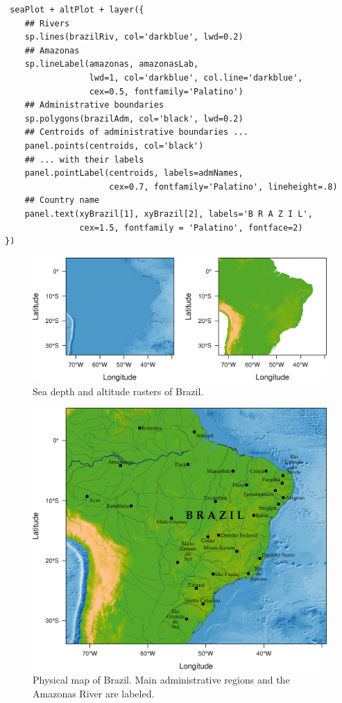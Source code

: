 \documentclass[smallroyalvopaper]{memoir}
\begin{document}
\begin{enumerate}

\lstset{language=R,numbers=none}
\begin{lstlisting}
 seaPlot + altPlot + layer({
    ## Rivers
    sp.lines(brazilRiv, col='darkblue', lwd=0.2)
    ## Amazonas
    sp.lineLabel(amazonas, amazonasLab, 
                 lwd=1, col='darkblue', col.line='darkblue',
                 cex=0.5, fontfamily='Palatino')
    ## Administrative boundaries
    sp.polygons(brazilAdm, col='black', lwd=0.2)
    ## Centroids of administrative boundaries ...
    panel.points(centroids, col='black')
    ## ... with their labels
    panel.pointLabel(centroids, labels=admNames,
                     cex=0.7, fontfamily='Palatino', lineheight=.8)
    ## Country name
    panel.text(xyBrazil[1], xyBrazil[2], labels='B R A Z I L',
               cex=1.5, fontfamily = 'Palatino', fontface=2)
})
\end{lstlisting}
\end{enumerate}

\begin{figure}[htb]
\centering
\includegraphics[width=.9\linewidth]{figs/rastersBrazil.png}
\caption{\label{fig:rastersBrazil}Sea depth and altitude rasters of Brazil.}
\end{figure}


\begin{figure}[htb]
\centering
\includegraphics[width=.9\linewidth]{figs/brazil.png}
\caption{\label{fig:brazil}Physical map of Brazil. Main administrative regions and the Amazonas River are labeled.}
\end{figure}
\end{document}
